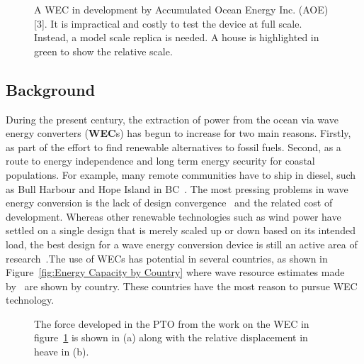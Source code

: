 \documentclass{article}
\begin{document}

\begin{figure}[!ht]
    \centering
    \caption{\label{fig:AOE_full_and_model_scale}A WEC in development by Accumulated Ocean Energy Inc. (AOE)[3]. It is impractical and costly to test the device at full scale. Instead, a model scale replica is needed. A house is highlighted in green to show the relative scale.}
\end{figure}
\clearpage 
\subsection{Background}


During the present century, the extraction of power from the ocean via wave energy converters (\textbf{WEC}s) has begun to increase for two main reasons. Firstly, as part of the effort to find renewable alternatives to fossil fuels. Second, as a route to energy independence and long term energy security for coastal populations. For example, many remote communities have to ship in diesel, such as Bull Harbour and Hope Island in BC~\cite{CANGOVREMOTE2011}. The most pressing problems in wave energy conversion is the lack of design convergence~\cite{ShamiPAReview2018} and the related cost of development. Whereas other renewable technologies such as wind power have settled on a single design that is merely scaled up or down based on its intended load, the best design for a wave energy conversion device is still an active area of research~\cite{ShamiPAReview2018}.The use of WECs has potential in several countries, as shown in Figure~\ref{fig:Energy Capacity by Country} where wave resource estimates made by~\cite{GUNN2012} are shown by country. These countries have the most reason to pursue WEC technology.


\begin{figure}[!ht]
    \centering
    \caption{\label{fig:AOE_force_profile} The force developed in the PTO from the work on the WEC in figure~\ref{fig:AOE_full_and_model_scale} is shown in (a) along with the relative displacement in heave in (b).}
\end{figure}







 \clearpage
\end{document}
